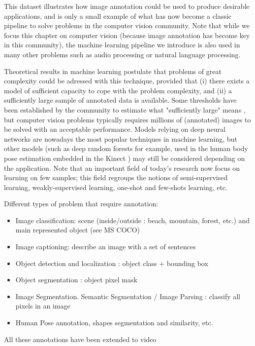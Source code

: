 This dataset illustrates how image annotation could be used to produce desirable applications, and is only a small example of what has now become a classic pipeline to solve problems in the computer vision community. Note that while we focus this chapter on computer vision (because image annotation has become key in this community), the machine learning pipeline we introduce is also used in many other problems such as audio processing or natural language processing. 

Theoretical results in machine learning postulate that problems of great complexity could be adressed with this technique, provided that (i) there exists a model of sufficient capacity to cope with the problem complexity, and (ii) a sufficiently large sample of annotated data is available. Some thresholds have been established by the community to estimate what "sufficiently large" means \cite{bla bla}, but computer vision problems typically requires millions of (annotated) images to be solved with an acceptable performance. Models relying on deep neural networks are nowadays the most popular techniques in machine learning, but other models (such as deep random forests for example, used in the human body pose estimation embedded in the Kinect \cite{blabla}) may still be considered depending on the application. Note that an important field of today's research now focus on learning on few samples; this field regroups the notions of semi-supervised learning, weakly-supervised learning, one-shot and few-shots learning, etc. 

 




Different types of problem that require annotation:
\begin{itemize}
	\item Image classification: scene (inside/outside : beach, mountain, forest, etc.) and main represented object (see MS COCO)
	\item Image captioning: describe an image with a set of sentences
	\item Object detection and localization : object class + bounding box
	\item Object segmentation : object pixel mask
	\item Image Segmentation. Semantic Segmentation / Image Parsing : classify all pixels in an image
	\item Human Pose annotation, shapes segmentation and similarity, etc.
\end{itemize}
All these annotations have been extended to video \\ \\


